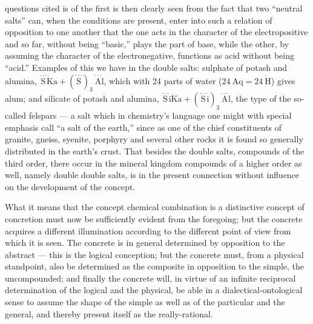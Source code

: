 \documentclass[12pt,a4paper]{book}
\begin{document}
questions cited is of the first is then clearly seen from the fact that two
``neutral salts'' can, when the conditions are present, enter into such a
relation of opposition to one another that the one acts in the character of the
electropositive and so far, without being ``basic,'' plays the part of base,
while the other, by assuming the character of the electronegative, functions as
acid without being ``acid.'' Examples of this we have in the double salts:
sulphate of potash and alumina,
$\stackrel{\cdot\cdot\cdot}{\mathrm{S}}\dot{\mathrm{K}}\mathrm{a} +
(\stackrel{\cdot\cdot\cdot}{\mathrm{S}})_3\,\stackrel{\cdot\cdot\cdot}{\mathrm{A}}\mathrm{l}$,
which with 24 parts of water
($24\ \mathrm{Aq} = 24\ \dot{\mathrm{H}}$) gives alum; and silicate of potash
and alumina,
$\stackrel{\cdot\cdot\cdot}{\mathrm{S}}\mathrm{i}\dot{\mathrm{K}}\mathrm{a} +
(\stackrel{\cdot\cdot\cdot}{\mathrm{S}}\mathrm{i})_3\,\stackrel{\cdot\cdot\cdot}{\mathrm{A}}\mathrm{l}$,
the type of the so-called felspars --- a salt which in chemistry's language one
might with special emphasis call ``a salt of the earth,'' since as one of the
chief constituents of granite, gneiss, syenite, porphyry and several other
rocks it is found so generally distributed in the earth's crust. That besides
the double salts, compounds of the third order, there occur in the mineral
kingdom compounds of a higher order as well, namely double double salts, is in
the present connection without influence on the development of the concept.

What it means that the concept chemical combination is a distinctive concept of
concretion must now be sufficiently evident from the foregoing; but the
concrete acquires a different illumination according to the different point of
view from which it is seen. The concrete is in general determined by opposition
to the abstract --- this is the logical conception; but the concrete must, from
a physical standpoint, also be determined as the composite in opposition to the
simple, the uncompounded; and finally the concrete will, in virtue of an
infinite reciprocal determination of the logical and the physical, be able in a
dialectical-ontological sense to assume the shape of the simple as well as of
the particular and the general, and thereby present itself as the
really-rational.
\end{document}
